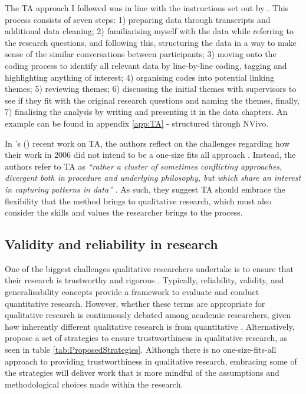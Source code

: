 The TA approach I followed was in line with the instructions set out by \cite{braun_one_2020}. This process consists of seven steps: 1) preparing data through transcripts and additional data cleaning; 2) familiarising myself with the data while referring to the research questions, and following this, structuring the data in a way to make sense of the similar conversations between participants; 3) moving onto the coding process to identify all relevant data by line-by-line coding, tagging and highlighting anything of interest; 4) organising codes into potential linking themes; 5) reviewing themes; 6) discussing the initial themes with supervisors to see if they fit with the original research questions and naming the themes, finally, 7) finalising the analysis by writing and presenting it in the data chapters. An example can be found in appendix \ref{app:TA} - structured through NVivo.


In \citeauthor{braun_one_2020}'s (\citeyear{braun_one_2020}) recent work on TA, the authors reflect on the challenges regarding how their work in 2006 did not intend to be a one-size fits all approach \citep{braun_using_2006}. Instead, the authors refer to TA as \textit{``rather a cluster of sometimes conflicting approaches, divergent both in procedure and underlying philosophy, but which share an interest in capturing patterns in data''} \citep[p.333]{braun_one_2020}. As such, they suggest TA should embrace the flexibility that the method brings to qualitative research, which must also consider the skills and values the researcher brings to the process.

\subsection{Validity and reliability in research}
\label{TA:Reliability}
One of the biggest challenges qualitative researchers undertake is to ensure that their research is trustworthy and rigorous \citep{finlay2006rigour}. Typically, reliability, validity, and generalisability concepts provide a framework to evaluate and conduct quantitative research. However, whether these terms are appropriate for qualitative research is continuously debated among academic researchers, given how inherently different qualitative research is from quantitative \citep{ryan2009rigour}. Alternatively, \cite{noble2015issues} propose a set of strategies to ensure trustworthiness in qualitative research, as seen in table \ref{tab:ProposedStrategies}. Although there is no one-size-fits-all approach to providing trustworthiness in qualitative research, embracing some of the strategies will deliver work that is more mindful of the assumptions and methodological choices made within the research.  

